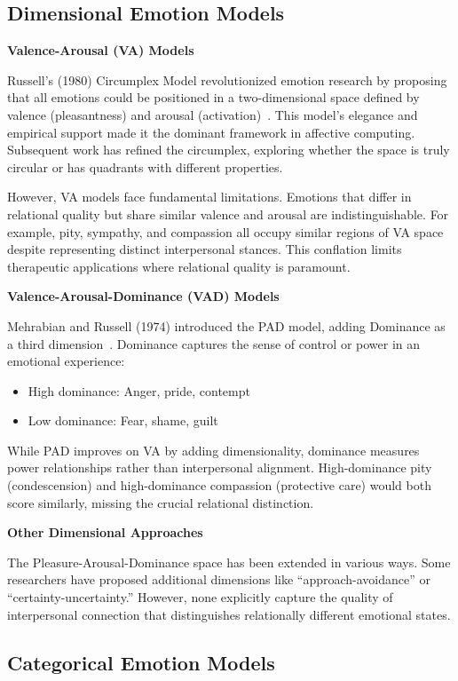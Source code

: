 \subsection{Dimensional Emotion Models}

\textbf{Valence-Arousal (VA) Models}

Russell's (1980) Circumplex Model revolutionized emotion research by proposing that all emotions could be positioned in a two-dimensional space defined by valence (pleasantness) and arousal (activation)~\cite{russell1980}. This model's elegance and empirical support made it the dominant framework in affective computing. Subsequent work has refined the circumplex, exploring whether the space is truly circular or has quadrants with different properties.

However, VA models face fundamental limitations. Emotions that differ in relational quality but share similar valence and arousal are indistinguishable. For example, pity, sympathy, and compassion all occupy similar regions of VA space despite representing distinct interpersonal stances. This conflation limits therapeutic applications where relational quality is paramount.

\textbf{Valence-Arousal-Dominance (VAD) Models}

Mehrabian and Russell (1974) introduced the PAD model, adding Dominance as a third dimension~\cite{mehrabian1974}. Dominance captures the sense of control or power in an emotional experience:
\begin{itemize}
    \item High dominance: Anger, pride, contempt
    \item Low dominance: Fear, shame, guilt
\end{itemize}

While PAD improves on VA by adding dimensionality, dominance measures power relationships rather than interpersonal alignment. High-dominance pity (condescension) and high-dominance compassion (protective care) would both score similarly, missing the crucial relational distinction.

\textbf{Other Dimensional Approaches}

The Pleasure-Arousal-Dominance space has been extended in various ways. Some researchers have proposed additional dimensions like ``approach-avoidance'' or ``certainty-uncertainty.'' However, none explicitly capture the quality of interpersonal connection that distinguishes relationally different emotional states.

\subsection{Categorical Emotion Models}

